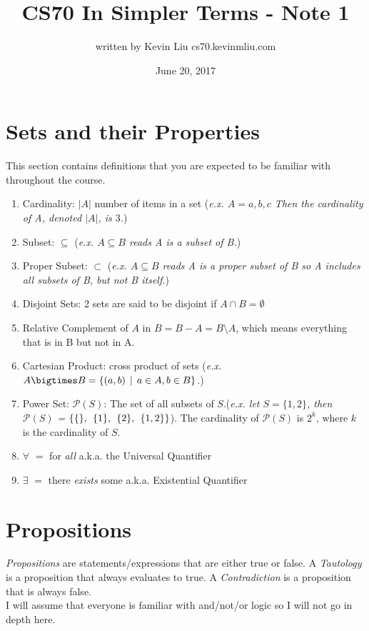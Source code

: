 \documentclass[a4paper]{article}
\title{CS70 In Simpler Terms - Note 1}
\author{written by Kevin Liu cs70.kevinmliu.com}
\date{June 20, 2017}
\begin{document}
\maketitle

\section{Sets and their Properties}
This section contains definitions that you are expected to be familiar with throughout the course. 

\begin{enumerate}
	\item Cardinality: $|A|$ number of items in a set (\textit{e.x. $A = {a, b, c}$ Then the cardinality of A, denoted $|A|$, is $3$.})
	\item Subset: $\subseteq$ (\textit{e.x. $A \subseteq B$ reads A is a subset of B.})
	\item Proper Subset: $\subset$ (\textit{e.x. $A \subseteq B$ reads A is a proper subset of B so A includes all subsets of B, but not B itself.})
	\item Disjoint Sets: 2 sets are said to be disjoint if $A \cap B = \emptyset$
	\item Relative Complement of $A$ in $B = B - A = B$\textbackslash $A$, which means everything that is in B but not in A.
	\item Cartesian Product: cross product of sets (\textit{e.x. $A \bigtimes B = \{(a,b) \hspace{1ex}| \hspace{1ex} a\in A, b\in B\}$.}) 
	\item Power Set: $\mathscr{P}(S)$: The set of all subsets of $S$.(\textit{e.x. let $S = \{1,2\}$, then $\mathscr{P}(S)$ = $\{ \{\}, \hspace{1ex}\{1\}, \hspace{1ex}\{2\}, \hspace{1ex}\{1,2\}\}$}). The cardinality of $\mathscr{P}(S)$ is $2^k$, where $k$ is the cardinality of $S$.
	\item $\forall$ $=$ for \textit{all} a.k.a. the Universal Quantifier
	\item $\exists$ $=$ there \textit{exists} some a.k.a. Existential Quantifier
	
\end{enumerate}

\section{Propositions}
\textit{Propositions} are statements/expressions that are either true or false. A \textit{Tautology} is a proposition that always evaluates to true. A \textit{Contradiction} is a proposition that is always false.\\
I will assume that everyone is familiar with and/not/or logic so I will not go in depth here.
\end{document}
